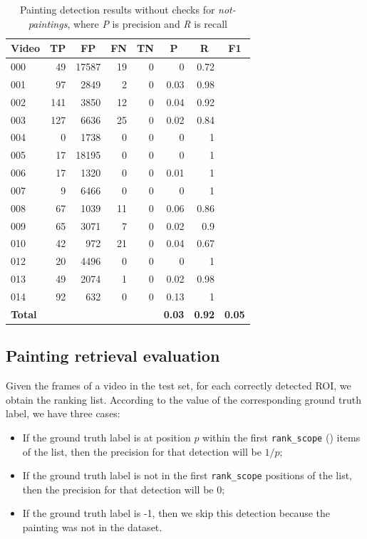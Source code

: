 \documentclass[10pt,twocolumn,letterpaper]{article}
\begin{document}
\begin{table}[]
\begin{center}
\begin{tabular}{lrrrrrrr}
\multicolumn{1}{c}{\textbf{Video}} & \multicolumn{1}{c}{\textbf{TP}} & \multicolumn{1}{c}{\textbf{FP}} & \multicolumn{1}{c}{\textbf{FN}} & \multicolumn{1}{c}{\textbf{TN}} & \multicolumn{1}{c}{\textbf{P}} & \multicolumn{1}{c}{\textbf{R}} & \multicolumn{1}{c}{\textbf{F1}} \\ \hline \hline
000 & 49 & 17587 & 19 & 0 & 0 & 0.72 &  \\
001 & 97 & 2849 & 2 & 0 & 0.03 & 0.98 &  \\
002 & 141 & 3850 & 12 & 0 & 0.04 & 0.92 &  \\
003 & 127 & 6636 & 25 & 0 & 0.02 & 0.84 &  \\
004 & 0 & 1738 & 0 & 0 & 0 & 1 &  \\
005 & 17 & 18195 & 0 & 0 & 0 & 1 &  \\
006 & 17 & 1320 & 0 & 0 & 0.01 & 1 &  \\
007 & 9 & 6466 & 0 & 0 & 0 & 1 &  \\
008 & 67 & 1039 & 11 & 0 & 0.06 & 0.86 &  \\
009 & 65 & 3071 & 7 & 0 & 0.02 & 0.9 &  \\
010 & 42 & 972 & 21 & 0 & 0.04 & 0.67 &  \\
012 & 20 & 4496 & 0 & 0 & 0 & 1 &  \\
013 & 49 & 2074 & 1 & 0 & 0.02 & 0.98 &  \\
014 & 92 & 632 & 0 & 0 & 0.13 & 1 &  \\ \hline \hline
\textbf{Total} &  &  &  &  & \textbf{0.03} & \textbf{0.92} & \textbf{0.05} \\
\end{tabular}
\end{center}
\caption{Painting detection results without checks for \textit{not-paintings}, where \textit{P} is precision and \textit{R} is recall}
\label{tab:PaintingDetectionResults2}
\end{table}

\subsection{Painting retrieval evaluation}
\label{subsec:PaintingRetrievalEvaluation}
Given the frames of a video in the test set, for each correctly detected ROI, we obtain the ranking list. According to the value of the corresponding ground truth label, we have three cases:
\begin{itemize}
    \item If the ground truth label is at position $p$ within the first \texttt{rank\_scope} () items of the list, then the precision for that detection will be $1/p$;
    \item If the ground truth label is not in the first \texttt{rank\_scope} positions of the list, then the precision for that detection will be 0;
    \item If the ground truth label is -1, then we skip this detection because the painting was not in the dataset.
\end{itemize}
\end{document}
